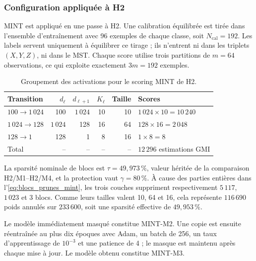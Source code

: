 \subsubsection{Configuration appliquée à H2}

MINT est appliqué en une passe à H2. Une calibration équilibrée est tirée dans
l'ensemble d'entraînement avec 96 exemples de chaque classe, soit
$N_{\mathrm{cal}}=192$. Les labels servent uniquement à équilibrer ce tirage ;
ils n'entrent ni dans les triplets $(X,Y,Z)$, ni dans le MST. Chaque score
utilise trois partitions de $m=64$ observations, ce qui exploite exactement
$3m=192$ exemples.

\begin{table}[!ht]
    \centering
    \begin{tabularx}{\textwidth}{|l|r|r|r|r|X|}
        \hline
        Transition & $d_{\ell}$ & $d_{\ell+1}$ & $K_{\ell}$ & Taille & Scores \\ \hline
        $100\rightarrow1\,024$ & 100 & $1\,024$ & 10 & 10 & $1\,024\times10=10\,240$ \\ \hline
        $1\,024\rightarrow128$ & $1\,024$ & 128 & 16 & 64 & $128\times16=2\,048$ \\ \hline
        $128\rightarrow1$ & 128 & 1 & 8 & 16 & $1\times8=8$ \\ \hline
        Total & -- & -- & -- & -- & $12\,296$ estimations GMI \\ \hline
    \end{tabularx}
    \caption{Groupement des activations pour le scoring MINT de H2.}
    \label{tab:groupes_mint_h2}
\end{table}

La sparsité nominale de blocs est
$\tau=49{,}973\,\%$, valeur héritée de la comparaison H2/M1--H2/M4, et la
protection vaut $\gamma=80\,\%$. À cause des parties entières dans
l'\autoref{eq:blocs_prunes_mint}, les trois couches suppriment respectivement
$5\,117$, $1\,023$ et 3 blocs. Comme leurs tailles valent 10, 64 et 16, cela
représente $116\,690$ poids annulés sur $233\,600$, soit une sparsité
effective de $49{,}953\,\%$.

Le modèle immédiatement masqué constitue MINT-M2. Une copie est ensuite
réentraînée au plus dix époques avec Adam, un batch de 256, un taux
d'apprentissage de $10^{-3}$ et une patience de 4 ; le masque est maintenu après
chaque mise à jour. Le modèle obtenu constitue MINT-M3.

